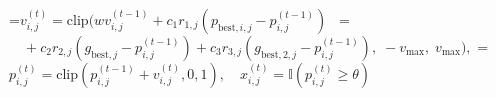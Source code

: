 \documentclass[final,5p,times,twocolumn]{elsarticle}
\begin{document}
=\hbox{$\displaystyle v_{i,j}^{(t)} = \mathrm{clip}\bigl(w v_{i,j}^{(t-1)} + c_1 r_{1,j} (p_{\mathrm{best},i,j} - p_{i,j}^{(t-1)})$ }
\showthe{}
=\hbox{$\displaystyle \quad + c_2 r_{2,j} (g_{\mathrm{best},j} - p_{i,j}^{(t-1)}) + c_3 r_{3,j} (g_{\mathrm{best},2,j} - p_{i,j}^{(t-1)}), \; -v_{\max}, \; v_{\max}\bigr),$}
\showthe{}
=\hbox{$\displaystyle p_{i,j}^{(t)} = \mathrm{clip}(p_{i,j}^{(t-1)} + v_{i,j}^{(t)}, 0, 1), \quad x_{i,j}^{(t)} = \mathbb{I}(p_{i,j}^{(t)} \ge \theta)$}
\showthe{}
\end{document}
